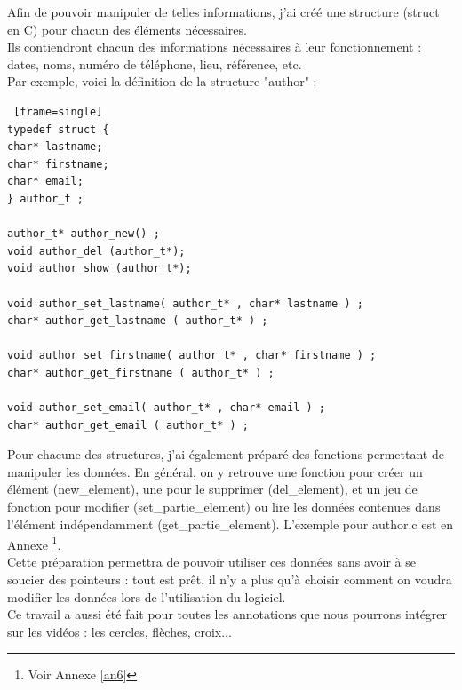 \documentclass[11pt,french,a4paper]{report}
\begin{document}
Afin de pouvoir manipuler de telles informations, j'ai créé une structure (struct en C) pour chacun des éléments nécessaires. \\
Ils contiendront chacun des informations nécessaires à leur fonctionnement : dates, noms, numéro de téléphone, lieu, référence, etc. \\

Par exemple, voici la définition de la structure "author" : 
\begin{lstlisting} [frame=single]
typedef struct {
char* lastname;
char* firstname;
char* email;
} author_t ;

author_t* author_new() ;
void author_del (author_t*);
void author_show (author_t*);

void author_set_lastname( author_t* , char* lastname ) ;
char* author_get_lastname ( author_t* ) ;

void author_set_firstname( author_t* , char* firstname ) ;
char* author_get_firstname ( author_t* ) ;

void author_set_email( author_t* , char* email ) ;
char* author_get_email ( author_t* ) ;
\end{lstlisting}

Pour chacune des structures, j'ai également préparé des fonctions permettant de manipuler les données.
En général, on y retrouve une fonction pour créer un élément (new\_element), une pour le supprimer (del\_element),
et un jeu de fonction pour modifier (set\_partie\_element) ou lire les données contenues dans l'élément indépendamment 
(get\_partie\_element). L'exemple pour author.c est en Annexe \footnote{Voir Annexe \ref{an6}}.\\

Cette préparation permettra de pouvoir utiliser ces données sans avoir à se soucier des pointeurs : tout est prêt, il n'y
a plus qu'à choisir comment on voudra modifier les données lors de l'utilisation du logiciel. \\

Ce travail a aussi été fait pour toutes les annotations que nous pourrons intégrer sur les vidéos : 
les cercles, flèches, croix... \\
\end{document}
